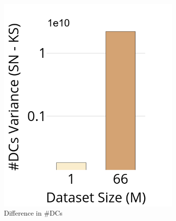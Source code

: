 \begin{figure}[!htb]
		\captionsetup{justification=centering}
		\captionsetup[subfigure]{justification=centering}
	\begin{subfigure}{0.3\textwidth}
		\includegraphics[width=\textwidth]{../img/oigas/SS/deepdcidxep.png}
		\caption{Difference in \#DCs} 
		\label{oigas:ss:impact:dcs}
		\end{subfigure}
  	\begin{subfigure}{0.3\textwidth}

\end{subfigure}
\end{figure}
